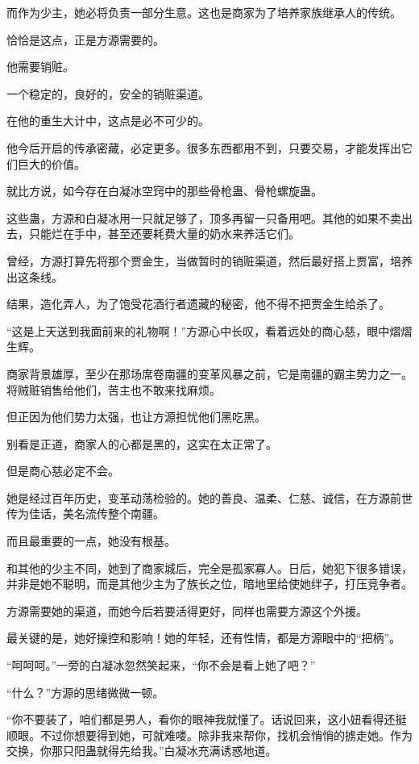 \begin{this_body}
而作为少主，她必将负责一部分生意。这也是商家为了培养家族继承人的传统。

恰恰是这点，正是方源需要的。

他需要销赃。

一个稳定的，良好的，安全的销赃渠道。

在他的重生大计中，这点是必不可少的。

他今后开启的传承密藏，必定更多。很多东西都用不到，只要交易，才能发挥出它们巨大的价值。

就比方说，如今存在白凝冰空窍中的那些骨枪蛊、骨枪螺旋蛊。

这些蛊，方源和白凝冰用一只就足够了，顶多再留一只备用吧。其他的如果不卖出去，只能烂在手中，甚至还要耗费大量的奶水来养活它们。

曾经，方源打算先将那个贾金生，当做暂时的销赃渠道，然后最好搭上贾富，培养出这条线。

结果，造化弄人，为了饱受花酒行者遗藏的秘密，他不得不把贾金生给杀了。

“这是上天送到我面前来的礼物啊！”方源心中长叹，看着远处的商心慈，眼中熠熠生辉。

商家背景雄厚，至少在那场席卷南疆的变革风暴之前，它是南疆的霸主势力之一。将贼赃销售给他们，苦主也不敢来找麻烦。

但正因为他们势力太强，也让方源担忧他们黑吃黑。

别看是正道，商家人的心都是黑的，这实在太正常了。

但是商心慈必定不会。

她是经过百年历史，变革动荡检验的。她的善良、温柔、仁慈、诚信，在方源前世传为佳话，美名流传整个南疆。

而且最重要的一点，她没有根基。

和其他的少主不同，她到了商家城后，完全是孤家寡人。日后，她犯下很多错误，并非是她不聪明，而是其他少主为了族长之位，暗地里给使她绊子，打压竞争者。

方源需要她的渠道，而她今后若要活得更好，同样也需要方源这个外援。

最关键的是，她好操控和影响！她的年轻，还有性情，都是方源眼中的“把柄”。

“呵呵呵。”一旁的白凝冰忽然笑起来，“你不会是看上她了吧？”

“什么？”方源的思绪微微一顿。

“你不要装了，咱们都是男人，看你的眼神我就懂了。话说回来，这小妞看得还挺顺眼。不过你想要得到她，可就难喽。除非我来帮你，找机会悄悄的掳走她。作为交换，你那只阳蛊就得先给我。”白凝冰充满诱惑地道。


\end{this_body}
